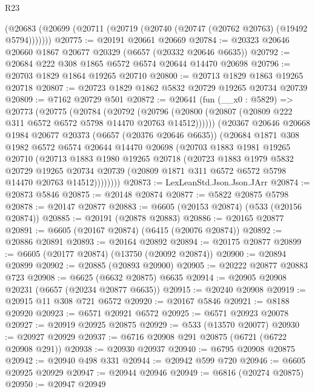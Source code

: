 \begin{lexlean}{R23}
\begin{coremodule}
    (@20683 (@20699 (@20711 (@20719 (@20740 (@20747 (@20762 @20763) (@19492 @5794)))))))
@20775 := @20191 @20661 @20669
@20784 := @20323 @20646 @20660 @1867 @20677 @20329 (@6657 (@20332 @20646 @6635))
@20792 := @20684 @222 @308 @1865 @6572 @6574 @20644 @14470 @20698
@20796 := @20703 @1829 @1864 @19265 @20710
@20800 := @20713 @1829 @1863 @19265 @20718
@20807 := @20723 @1829 @1862 @5832 @20729 @19265 @20734 @20739
@20809 := @7162 @20729 @501
@20872 := @20641
    (fun (__x0 : @5829) =>
    @20773
      (@20775
        (@20784
          (@20792
            (@20796 (@20800 (@20807 (@20809 @222 @311 @6572 @6572 @5798 @14470 @20763 @14512))))))
        (@20367
          @20646
          @20668
          @1984
          @20677
          @20373
          (@6657 (@20376 @20646 @6635))
          (@20684
            @1871
            @308
            @1982
            @6572
            @6574
            @20644
            @14470
            @20698
            (@20703
              @1883
              @1981
              @19265
              @20710
              (@20713
                @1883
                @1980
                @19265
                @20718
                (@20723
                  @1883
                  @1979
                  @5832
                  @20729
                  @19265
                  @20734
                  @20739
                  (@20809 @1871 @311 @6572 @6572 @5798 @14470 @20763 @14512))))))))
@20873 := LexLeanStd.Json.Json.JArr
@20874 := @20873 @5846
@20875 := @20148 @20874
@20877 := @5822 @20875 @5798
@20878 := @20147 @20877
@20883 := @6605 (@20153 @20874) (@533 (@20156 @20874))
@20885 := @20191 (@20878 @20883)
@20886 := @20165 @20877
@20891 := @6605 (@20167 @20874) (@6415 (@20076 @20874))
@20892 := @20886 @20891
@20893 := @20164 @20892
@20894 := @20175 @20877
@20899 := @6605 (@20177 @20874) (@13750 (@20092 @20874))
@20900 := @20894 @20899
@20902 := @20885 (@20893 @20900)
@20905 := @20222 @20877 @20883 @723
@20908 := @6625 (@6632 @20875) @6635
@20914 := @20905 @20908 @20231 (@6657 (@20234 @20877 @6635))
@20915 := @20240 @20908
@20919 := @20915 @11 @308 @721 @6572
@20920 := @20167 @5846
@20921 := @8188 @20920
@20923 := @6571 @20921 @6572
@20925 := @6571 @20923 @20078
@20927 := @20919 @20925 @20875
@20929 := @533 (@13570 @20077)
@20930 := @20927 @20929
@20937 := @6716 @20908 @291 @20875 (@6721 (@6722 @20908 @291))
@20938 := @20930 @20937
@20940 := @6795 @20908 @20875
@20942 := @20940 @498 @331
@20944 := @20942 @599 @720
@20946 := @6605 @20925 @20929
@20947 := @20944 @20946
@20949 := @6816 (@20274 @20875)
@20950 := @20947 @20949

\end{coremodule}
\end{lexlean}

